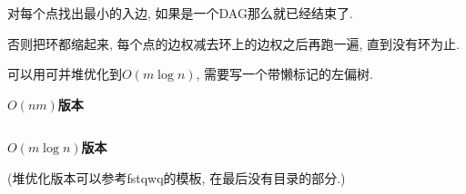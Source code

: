 对每个点找出最小的入边, 如果是一个DAG那么就已经结束了.

否则把环都缩起来, 每个点的边权减去环上的边权之后再跑一遍, 直到没有环为止.

可以用可并堆优化到$O(m\log n)$, 需要写一个带懒标记的左偏树.

{\large\textbf{$O(nm)$版本}}

\inputminted{cpp}{../src/graph/最小树形图.cpp}

{\large\textbf{$O(m\log n)$版本}}

(堆优化版本可以参考fstqwq的模板, 在最后没有目录的部分.)